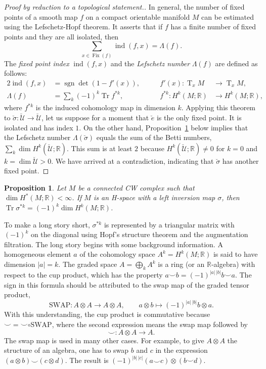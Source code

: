 \documentclass[12pt]{article}
\newcommand{\RR}{\mathbb{R}}
\newcommand{\calU}{\mathcal{U}}
\DeclareMathOperator{\Tr}{Tr}
\DeclareMathOperator{\sgn}{sgn}
\DeclareMathOperator{\ind}{ind}
\DeclareMathOperator{\Ta}{T}
\DeclareMathOperator{\Fix}{Fix}
\newcommand{\Sw}{\mathrm{SWAP}}
\newtheorem{Proposition}[Theorem]{Proposition}
\newtheorem[definition]{Definition}[Theorem]{Definition}
\newtheorem[remark]{Example}[Theorem]{Example}
\newtheorem[remark]{Remark}[Theorem]{Remark}
\newtheorem[remark]{Question}[Theorem]{Open question}
\newtheorem*[definition]{definition}{Definition}
\newtheorem*[remark]{example}{Example}
\newtheorem*[remark]{remark}{Remark}
\newtheorem*[remark]{question}{Open question}
\numberwithin{equation}{section}
\begin{document}
\begin{proof}[Proof by reduction to a topological statement.]
In general, the number of fixed points of a smooth map $f$ on a compact orientable manifold $M$ can be estimated using the Lefschetz-Hopf theorem. It asserts that if $f$ has a finite number of fixed points and they are all isolated, then
\begin{equation}
\sum_{x\in\Fix(f)}\ind(f,x)=\Lambda(f).
\end{equation}
The \emph{fixed point index} $\ind(f,x)$ and the \emph{Lefschetz number} $\Lambda(f)$ are defined as follows:
\begin{alignat}{2}
\ind(f,x)&=\sgn\det(1-f'(x)),\qquad
& f'(x)\colon \Ta_xM&\to\Ta_xM,\\[2pt]
\Lambda(f)&=\sum_{k}(-1)^k\Tr f^{*k},\qquad
& f^{*k}\colon H^k(M;\RR)&\to H^k(M;\RR),
\end{alignat}
where $f^{*k}$ is the induced cohomology map in dimension $k$. Applying this theorem to $\breve{\sigma}\colon \breve{\calU}\to\breve{\calU}$, let us suppose for a moment that $\breve{e}$ is the only fixed point. It is isolated and has index $1$. On the other hand, Proposition~\ref{prop_H-group} below implies that the Lefschetz number $\Lambda(\breve{\sigma})$ equals the sum of the Betti numbers, $\sum_k\dim H^k(\breve{\calU};\RR)$. This sum is at least $2$ because $H^k(\breve{\calU};\RR)\not=0$ for $k=0$ and $k=\dim\breve{\calU}>0$. We have arrived at a contradiction, indicating that $\breve{\sigma}$ has another fixed point.
\end{proof}

\begin{Proposition}\label{prop_H-group}
Let $M$ be a connected CW complex such that $\dim H^*(M;\RR)<\infty$. If $M$ is an H-space with a left inversion map $\sigma$, then\, $\Tr\sigma^{*k}=(-1)^k\dim H^k(M;\RR)$.
\end{Proposition}

To make a long story short, $\sigma^{*k}$ is represented by a triangular matrix with $(-1)^k$ on the diagonal using Hopf's structure theorem and the augmentation filtration. The long story begins with some background information. A homogeneous element $a$ of the cohomology space $A^k=H^k(M;\RR)$ is said to have dimension $|a|=k$. The graded space  $A=\bigoplus_{k}A^k$ is a ring (or an $\RR$-algebra) with respect to the cup product, which has the property $a\smile b=(-1)^{|a|\,|b|}b\smile a$. The sign in this formula should be attributed to the swap map of the graded tensor product,
\begin{equation}
\Sw\colon A\otimes A\to A\otimes A,\qquad
a\otimes b\mapsto (-1)^{|a|\,|b|}b\otimes a.
\end{equation}
With this understanding, the cup product is commutative because ${\smile} = {\smile}\circ\Sw$, where the second expression means the swap map followed by
\begin{equation}
{\smile}\colon A\otimes A\to A.
\end{equation}
The swap map is used in many other cases. For example, to give $A\otimes A$ the structure of an algebra, one has to swap $b$ and $c$ in the expression $(a\otimes b)\smile(c\otimes d)$. The result is $(-1)^{|b|\,|c|}(a\smile c)\otimes(b\smile d)$.
\end{document}
